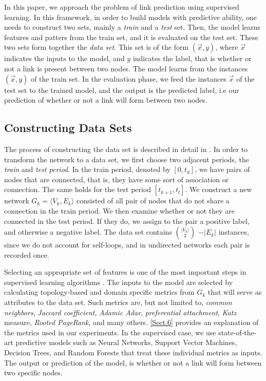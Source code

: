 \documentclass{acm_proc_article-sp}
\begin{document}
In this paper, we approach the problem of link prediction using supervised learning. In this framework, in order to build models with predictive ability, one needs to construct two sets, mainly a \textit{train} and a \textit{test} set. Then, the model learns features and patters from the train set, and it is evaluated on the test set. These two sets form together the \textit{data set}. This set is of the form $(\vec{x},y)$, where $\vec{x}$ indicates the inputs to the model, and $y$ indicates the label, that is whether or not a link is present between two nodes. The model learns from the instances $(\vec{x},y)$ of the train set. In the evaluation phase, we feed the instances $\vec{x}$ of the test set to the trained model, and the output is the predicted label, i.e our prediction of whether or not a link will form between two nodes.

\subsection{Constructing Data Sets}
\label{Sect.2a}

The process of constructing the data set is described in detail in \cite{Hasan06linkprediction, Lichtenwalter:2010:NPM:1835804.1835837}. In order to transform the network to a data set, we first choose two adjacent periods, the \textit{train} and \textit{test period}. In the train period, denoted by $[0,t_k]$, we have pairs of nodes that are connected, that is, they have some sort of association or connection. The same holds for the test period $[t_{k+1},t_l]$. We construct a new network $G_k = \langle V_k, E_k \rangle$ consisted of all pair of nodes that do not share a connection in the train period. We then examine whether or not they are connected in the test period. If they do, we assign to the pair a positive label, and otherwise a negative label. The data set contains $|V_k| \choose 2$ $-|E_k|$ instances, since we do not account for self-loops, and in undirected networks each pair is recorded once. 

Selecting an appropriate set of features is one of the most important steps in supervised learning algorithms \cite{Hasan06linkprediction}. The inputs to the model are selected by calculating topology-based and domain specific metrics from $G_k$ that will serve as attributes to the data set. Such metrics are, but not limited to, \textit{common neighbors}, \textit{Jaccard coefficient}, \textit{Adamic Adar}, \textit{preferential attachment}, \textit{Katz} measure, \textit{Rooted PageRank}, and many others. \ref{Sect.6} provides an explanation of the metrics used in our experiments. In the supervised case, we use state-of-the-art predictive models such as Neural Networks, Support Vector Machines, Decision Trees, and Random Forests that treat these individual metrics as inputs. The output or prediction of the model, is whether or not a link will form between two specific nodes. 
\end{document}
